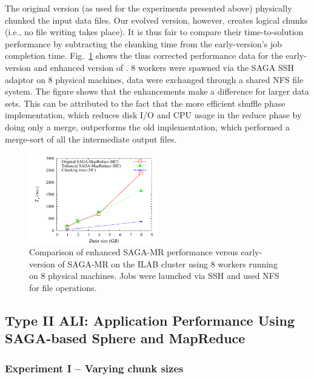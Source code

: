 \documentclass[3p,twocolumn]{elsarticle}
\begin{document}
The original \sagamapreduce version (as used for the experiments
presented above) physically chunked the input data files.  Our evolved
version, however, creates logical chunks (i.e., no file
writing takes place).  It is thus fair to compare their
time-to-solution performance by subtracting the chunking time from the
early-version's job completion time.  Fig.~\ref{fig:sagamr_comparison}
shows the thus corrected performance data for the early-version and
enhanced version of \sagamapreduce.  8 workers were spawned via the
SAGA SSH adaptor on 8 physical machines,  data were exchanged through
a shared NFS file system.  The figure shows that the \sagamapreduce
enhancements make a difference for larger data sets.  This can be
attributed to the fact that the more efficient shuffle phase
implementation, which reduces disk I/O and CPU usage in the reduce
phase by doing only a merge, outperforms the old implementation, which
performed a merge-sort of all the intermediate output files.

\begin{figure}[htb!]
 \includegraphics[width=0.5\textwidth]{figures/sagamr_comparison.pdf}
 \caption{
   Comparison of enhanced SAGA-MR performance versus
   early-version of SAGA-MR on the ILAB cluster using 8 workers running on 8
   physical machines. Jobs were launched via SSH and used NFS for file
   operations.
   \label{fig:sagamr_comparison}
   }
\end{figure}


\subsection{Type II ALI: Application Performance Using SAGA-based
Sphere and MapReduce}

\subsubsection{Experiment I -- Varying chunk sizes} 
\end{document}
